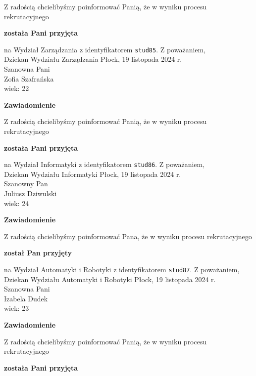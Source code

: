 \documentclass[12pt,a4paper]{article}
\begin{document}
\bigskip 
Z radością chcielibyśmy poinformować Panią, że w wyniku procesu rekrutacyjnego
\begin{center}
\textsf{\textbf{została Pani przyjęta}}
\end{center}
na Wydział Zarządzania z identyfikatorem \verb|stud85|. 
\vspace{2cm}
\noindent
Z poważaniem, \\
Dziekan
Wydziału Zarządzania
\newpage
\hfill Płock, 19 listopada 2024 r. \\
\noindent
Szanowna Pani \\
Zofia Szafrańska \\
wiek: 22
\bigskip
\begin{center}
    {\Large\textbf{Zawiadomienie}}
\end{center}
\bigskip 
Z radością chcielibyśmy poinformować Panią, że w wyniku procesu rekrutacyjnego
\begin{center}
\textsf{\textbf{została Pani przyjęta}}
\end{center}
na Wydział Informatyki z identyfikatorem \verb|stud86|. 
\vspace{2cm}
\noindent
Z poważaniem, \\
Dziekan
Wydziału Informatyki
\newpage
\hfill Płock, 19 listopada 2024 r. \\
\noindent
Szanowny Pan \\
Juliusz Dziwulski \\
wiek: 24
\bigskip
\begin{center}
    {\Large\textbf{Zawiadomienie}}
\end{center}
\bigskip 
Z radością chcielibyśmy poinformować Pana, że w wyniku procesu rekrutacyjnego
\begin{center}
\textsf{\textbf{został Pan przyjęty}}
\end{center}
na Wydział Automatyki i Robotyki z identyfikatorem \verb|stud87|. 
\vspace{2cm}
\noindent
Z poważaniem, \\
Dziekan
Wydziału Automatyki i Robotyki
\newpage
\hfill Płock, 19 listopada 2024 r. \\
\noindent
Szanowna Pani \\
Izabela Dudek \\
wiek: 23
\bigskip
\begin{center}
    {\Large\textbf{Zawiadomienie}}
\end{center}
\bigskip 
Z radością chcielibyśmy poinformować Panią, że w wyniku procesu rekrutacyjnego
\begin{center}
\textsf{\textbf{została Pani przyjęta}}
\end{center}
\end{document}
